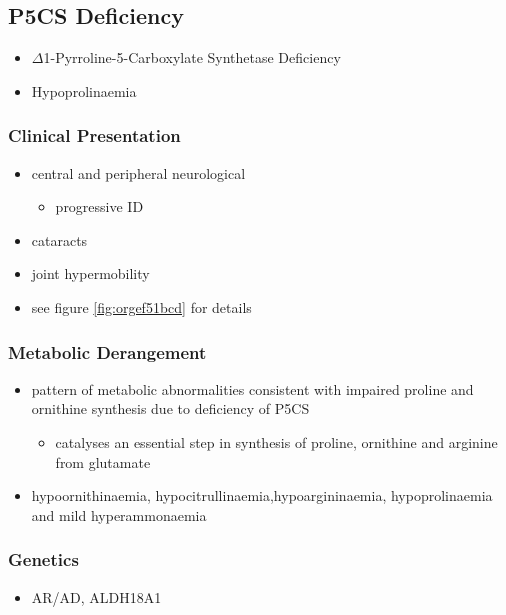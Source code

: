 \documentclass{scrartcl}
\begin{document}
\subsection{P5CS  Deficiency}
\label{sec:orgd479620}
\begin{itemize}
\item \(\Delta\)1-Pyrroline-5-Carboxylate Synthetase Deficiency
\item Hypoprolinaemia
\end{itemize}
\subsubsection{Clinical Presentation}
\label{sec:org82ae934}
\begin{itemize}
\item central and peripheral neurological
\begin{itemize}
\item progressive ID
\end{itemize}
\item cataracts
\item joint hypermobility
\item see figure \ref{fig:orgef51bcd} for details
\end{itemize}

\subsubsection{Metabolic Derangement}
\label{sec:org63e1255}
\begin{itemize}
\item pattern of metabolic abnormalities consistent with impaired proline
and ornithine synthesis due to deficiency of P5CS
\begin{itemize}
\item catalyses an essential step in synthesis of proline, ornithine and
arginine from glutamate
\end{itemize}
\item hypoornithinaemia, hypocitrullinaemia,hypoargininaemia,
hypoprolinaemia and mild hyperammonaemia
\end{itemize}

\subsubsection{Genetics}
\label{sec:org69dbcd2}
\begin{itemize}
\item AR/AD, ALDH18A1
\end{itemize}
\end{document}
